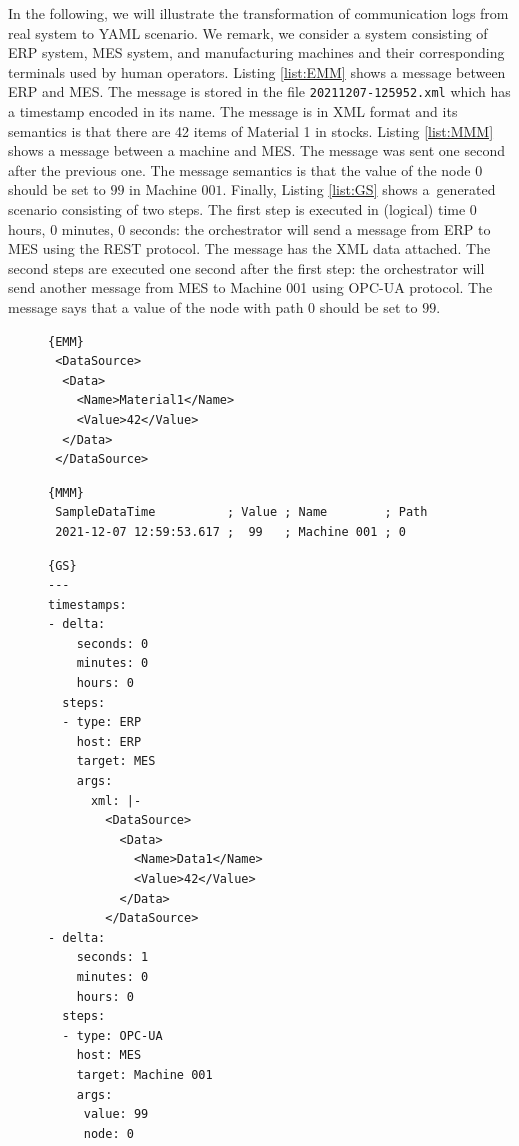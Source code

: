 {In the following, we will illustrate the transformation of communication logs
from real system to YAML scenario. We remark, we consider a system consisting
of ERP system, MES system, and manufacturing machines and their corresponding
terminals used by human operators.
%
Listing \ref{list:EMM} shows a message between ERP and MES. The message is
stored in the file \texttt{20211207-125952.xml} which has a timestamp encoded
in its name. The message is in XML format and its semantics is that there are 42
items of Material 1 in stocks. 
%
%
Listing \ref{list:MMM} shows a message between a machine and MES.  The message
was sent one second after the previous one. The message semantics is that
the value of the node $0$ should be set to $99$ in Machine $001$.
%
%
Finally, Listing \ref{list:GS} shows a~generated scenario consisting of two
steps.  The first step is executed in (logical) time 0 hours, 0 minutes, 0
seconds: the orchestrator will send a message from ERP to MES using the REST
protocol. The message has the XML data attached.  The second steps are executed
one second after the first step: the orchestrator will send another message
from MES to Machine 001 using OPC-UA protocol.  The message says that a value
of the node with path $0$ should be set to $99$.
%

\begin{figure}
\begin{lstlisting}[caption=20211207-125952.xml,frame=tlrb,label={list:EMM}]{EMM}
 <DataSource>
  <Data>
    <Name>Material1</Name>
    <Value>42</Value>
  </Data>
 </DataSource> 
\end{lstlisting}
\begin{lstlisting}[caption=MES and Machine message,label={list:MMM},frame=tlrb]{MMM}
 SampleDataTime          ; Value ; Name        ; Path
 2021-12-07 12:59:53.617 ;  99   ; Machine 001 ; 0
\end{lstlisting}

\begin{lstlisting}[caption=Generated scenario,frame=tlrb,label={list:GS}]{GS}
---
timestamps:
- delta:
    seconds: 0
    minutes: 0
    hours: 0
  steps:
  - type: ERP
    host: ERP
    target: MES
    args:
      xml: |-
        <DataSource>
          <Data>
            <Name>Data1</Name>
            <Value>42</Value>
          </Data>
        </DataSource>
- delta:
    seconds: 1
    minutes: 0 
    hours: 0
  steps:
  - type: OPC-UA
    host: MES
    target: Machine 001
    args:
     value: 99
     node: 0
\end{lstlisting}
\caption{}
\end{figure}

}
